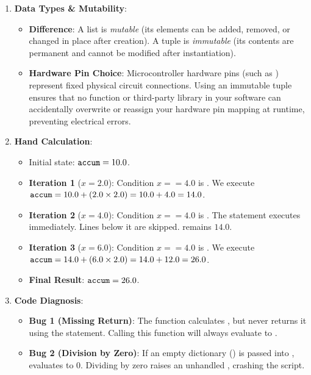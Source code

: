 \begin{enumerate}
    \item \textbf{Data Types \& Mutability}:
    \begin{itemize}
        \item \textbf{Difference}: A list is \textit{mutable} (its elements can be added, removed, or changed in place after creation). A tuple is \textit{immutable} (its contents are permanent and cannot be modified after instantiation).
        \item \textbf{Hardware Pin Choice}: Microcontroller hardware pins (such as ) represent fixed physical circuit connections. Using an immutable tuple ensures that no function or third-party library in your software can accidentally overwrite or reassign your hardware pin mapping at runtime, preventing electrical errors.
    \end{itemize}

    \item \textbf{Hand Calculation}:
    \begin{itemize}
        \item Initial state: $\code{accum} = 10.0$.
        \item \textbf{Iteration 1} ($x = 2.0$): Condition $x == 4.0$ is . We execute $\code{accum} = 10.0 + (2.0 \times 2.0) = 10.0 + 4.0 = 14.0$.
        \item \textbf{Iteration 2} ($x = 4.0$): Condition $x == 4.0$ is . The  statement executes immediately. Lines below it are skipped.  remains $14.0$.
        \item \textbf{Iteration 3} ($x = 6.0$): Condition $x == 4.0$ is . We execute $\code{accum} = 14.0 + (6.0 \times 2.0) = 14.0 + 12.0 = 26.0$.
        \item \textbf{Final Result}: $\code{accum} = 26.0$.
    \end{itemize}

    \item \textbf{Code Diagnosis}:
    \begin{itemize}
        \item \textbf{Bug 1 (Missing Return)}: The function calculates , but never returns it using the  statement. Calling this function will always evaluate to .
        \item \textbf{Bug 2 (Division by Zero)}: If an empty dictionary (\code{\{\}}) is passed into ,  evaluates to $0$. Dividing by zero raises an unhandled , crashing the script.
    \end{itemize}


\end{enumerate}
